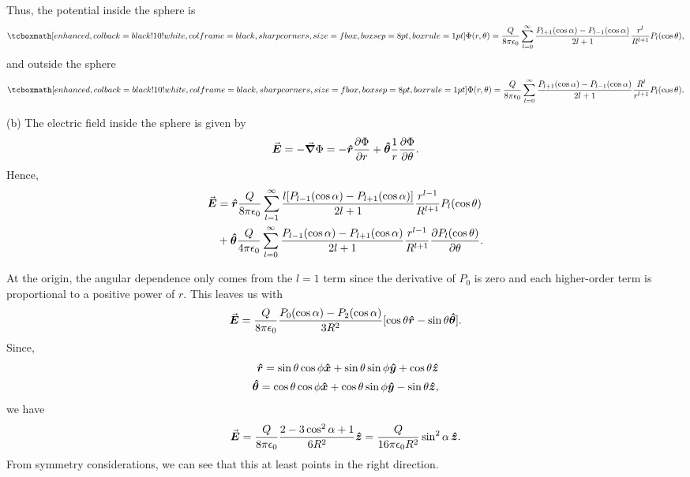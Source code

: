 {Thus, the potential inside the sphere is
\begin{eqnarray}
    \eqbox{
    \Phi(r,\theta) = \frac{Q}{8 \pi \epsilon_0} \sum_{l=0}^{\infty} \frac{P_{l+1}(\cos{\alpha}) - P_{l-1}(\cos{\alpha})}{2l+1} \frac{r^{l}}{R^{l+1}} P_{l}(\cos{\theta})
}
,\end{eqnarray}
and outside the sphere
\begin{eqnarray}
    \eqbox{
    \Phi(r,\theta) = \frac{Q}{8 \pi \epsilon_0} \sum_{l=0}^{\infty} \frac{P_{l+1}(\cos{\alpha}) - P_{l-1}(\cos{\alpha})}{2l + 1} \frac{R^{l}}{r^{l+1}} P_{l}(\cos{\theta})
}
.\end{eqnarray}

(b) The electric field inside the sphere is given by
\begin{eqnarray}
    \va*{E} = -\grad \Phi = -\vu*{r} \pdv{\Phi}{r} + \vu*{\theta} \frac{1}{r} \pdv{\Phi}{\theta}
.\end{eqnarray}
Hence,
\begin{align}
    \va*{E} &= \vu*{r} \frac{Q}{8 \pi \epsilon_0} \sum_{l=1}^{\infty} \frac{l [ P_{l-1}(\cos{\alpha}) - P_{l+1}(\cos{\alpha}) ]}{2l+1} \frac{r^{l-1}}{R^{l+1}} P_{l}(\cos{\theta}) \nonumber \\
    &+ \vu*{\theta} \frac{Q}{4 \pi \epsilon_0} \sum_{l=0}^{\infty} \frac{P_{l-1}(\cos{\alpha}) - P_{l+1}(\cos{\alpha})}{2l+1} \frac{r^{l-1}}{R^{l+1}} \pdv{P_{l}(\cos{\theta})}{\theta}
.\end{align}

At the origin, the angular dependence only comes from the $l=1$ term since the derivative of $P_{0}$ is zero and each higher-order term is proportional to a positive power of $r$.
This leaves us with
\begin{eqnarray}
    \va*{E} = \frac{Q}{8 \pi \epsilon_0} \frac{P_{0}(\cos{\alpha}) - P_{2}(\cos{\alpha})}{3 R^2} [ \cos{\theta}\vu*{r} - \sin{\theta} \vu*{\theta} ]
.\end{eqnarray}
Since,
\begin{eqnarray}
    \vu*{r} = \sin{\theta} \cos{\phi} \vu*{x} + \sin{\theta} \sin{\phi} \vu*{y} + \cos{\theta} \vu*{z} \\
    \vu*{\theta} = \cos{\theta} \cos{\phi} \vu*{x} + \cos{\theta} \sin{\phi} \vu*{y} - \sin{\theta} \vu*{z}
,\end{eqnarray}
we have
\begin{eqnarray}
    \va*{E} = \frac{Q}{8 \pi \epsilon_0} \frac{2 - 3\cos^2{\alpha} + 1}{6 R^2} \vu*{z} = \frac{Q}{16 \pi \epsilon_0 R^2} \sin^2{\alpha} \, \vu*{z}
.\end{eqnarray}
From symmetry considerations, we can see that this at least points in the right direction.

}
